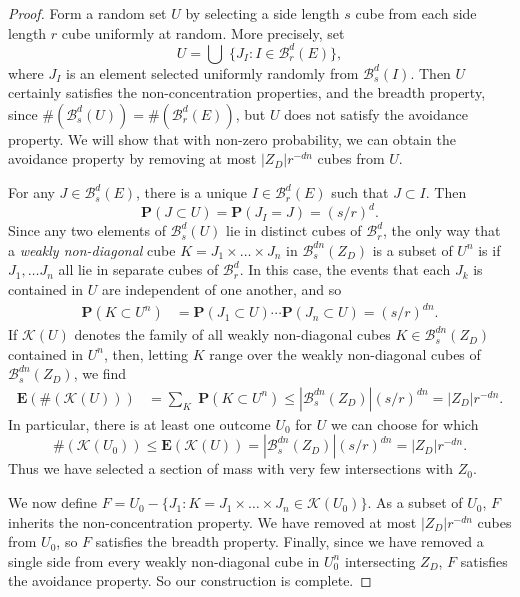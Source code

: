 \documentclass[usenames,dvipsnames]{article}
\theoremstyle{plain}
\theoremstyle{plain}
\begin{document}
\begin{proof}
	Form a random set $U$ by selecting a side length $s$ cube from each side length $r$ cube uniformly at random. More precisely, set
	\[ U = \bigcup\; \{ J_I: I \in \mathcal{B}^d_r(E) \}, \]
	where $J_I$ is an element selected uniformly randomly from $\mathcal{B}^d_s(I)$. Then $U$ certainly satisfies the non-concentration properties, and the breadth property, since $\# (\mathcal{B}^d_s(U)) = \# (\mathcal{B}^d_r(E))$, but $U$ does not satisfy the avoidance property. We will show that with non-zero probability, we can obtain the avoidance property by removing at most $|Z_D|r^{-dn}$ cubes from $U$.

	For any $J \in \mathcal{B}^d_s(E)$, there is a unique $I \in \mathcal{B}^d_r(E)$ such that $J \subset I$. Then
	\[ \mathbf{P}(J \subset U) = \mathbf{P}(J_I = J) = (s/r)^d. \]
	Since any two elements of $\mathcal{B}^d_s(U)$ lie in distinct cubes of $\mathcal{B}^d_r$, the only way that a {\it weakly non-diagonal} cube $K = J_1 \times \dots \times J_n$ in $\mathcal{B}^{dn}_s(Z_D)$ is a subset of $U^n$ is if $J_1, \dots J_n$ all lie in separate cubes of $\mathcal{B}^d_r$. In this case, the events that each $J_k$ is contained in $U$ are independent of one another, and so
	\begin{align*}
		\mathbf{P}(K \subset U^n) &= \mathbf{P}(J_1 \subset U) \cdots \mathbf{P}(J_n \subset U) = (s/r)^{dn}.
	\end{align*}
	If $\mathcal{K}(U)$ denotes the family of all weakly non-diagonal cubes $K \in \mathcal{B}^{dn}_s(Z_D)$ contained in $U^n$, then, letting $K$ range over the weakly non-diagonal cubes of $\mathcal{B}^{dn}_s(Z_D)$, we find
	\begin{align*}
		\mathbf{E}(\# (\mathcal{K}(U))) &= {\sum}_K\; \mathbf{P}(K \subset U^n) \leq |\mathcal{B}^{dn}_s(Z_D)| (s/r)^{dn} = |Z_D| r^{-dn}.
	\end{align*}
	In particular, there is at least one outcome $U_0$ for $U$ we can choose for which
	\[ \#(\mathcal{K}(U_0)) \leq \mathbf{E}(\mathcal{K}(U)) = |\mathcal{B}^{dn}_s(Z_D)| (s/r)^{dn} = |Z_D| r^{-dn}. \]
	Thus we have selected a section of mass with very few intersections with $Z_0$.

	We now define $F = U_0 - \{ J_1 : K = J_1 \times \dots \times J_n \in \mathcal{K}(U_0) \}$. As a subset of $U_0$, $F$ inherits the non-concentration property. We have removed at most $|Z_D| r^{-dn}$ cubes from $U_0$, so $F$ satisfies the breadth property. Finally, since we have removed a single side from every weakly non-diagonal cube in $U_0^n$ intersecting $Z_D$, $F$ satisfies the avoidance property. So our construction is complete.
\end{proof}
\end{document}
